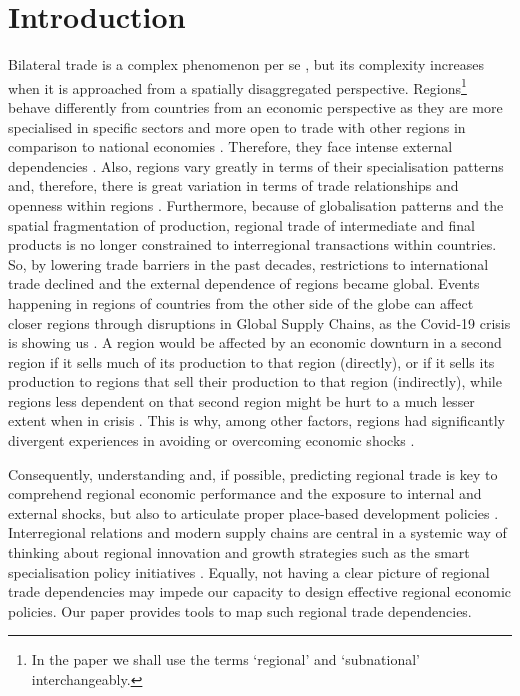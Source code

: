 \documentclass[]{interact}
\theoremstyle{plain}%
\theoremstyle{definition}
\theoremstyle{remark}
\begin{document}
\hypertarget{sec:1}{%
\section{Introduction}\label{sec:1}}

Bilateral trade is a complex phenomenon per se \citep{topology_trade},
but its complexity increases when it is approached from a spatially
disaggregated perspective. Regions\footnote{In the paper we shall use
  the terms `regional' and `subnational' interchangeably.} behave
differently from countries from an economic perspective as they are more
specialised in specific sectors and more open to trade with other
regions in comparison to national economies
\citep{isard1951interregional, miller2009input}. Therefore, they face
intense external dependencies \citep{matter2009economic}. Also, regions
vary greatly in terms of their specialisation patterns and, therefore,
there is great variation in terms of trade relationships and openness
within regions \citep{fingleton2012recessionary}. Furthermore, because
of globalisation patterns and the spatial fragmentation of production,
regional trade of intermediate and final products is no longer
constrained to interregional transactions within countries. So, by
lowering trade barriers in the past decades, restrictions to
international trade declined and the external dependence of regions
became global. Events happening in regions of countries from the other
side of the globe can affect closer regions through disruptions in
Global Supply Chains, as the Covid-19 crisis is showing us
\citep{guan2020global, david2013china}. A region would be affected by an
economic downturn in a second region if it sells much of its production
to that region (directly), or if it sells its production to regions that
sell their production to that region (indirectly), while regions less
dependent on that second region might be hurt to a much lesser extent
when in crisis \citep{thissen2016competitive}. This is why, among other
factors, regions had significantly divergent experiences in avoiding or
overcoming economic shocks \citep{kitsos2019role}.

Consequently, understanding and, if possible, predicting regional trade
is key to comprehend regional economic performance and the exposure to
internal and external shocks, but also to articulate proper place-based
development policies \citep{barca2009agenda}. Interregional relations
and modern supply chains are central in a systemic way of thinking about
regional innovation and growth strategies \citep{thissen2013integrated}
such as the smart specialisation policy initiatives
\citep{mccann2015smart}. Equally, not having a clear picture of regional
trade dependencies may impede our capacity to design effective regional
economic policies. Our paper provides tools to map such regional trade
dependencies.
\end{document}
